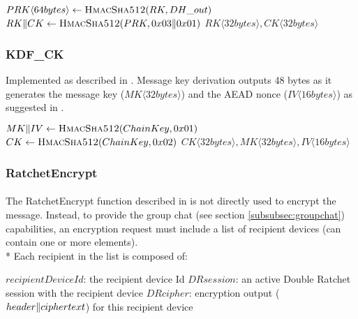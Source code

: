\documentclass[a4paper,11pt]{article}
\begin{document}
      \begin{algorithmic}
          \State $PRK\langle 64bytes\rangle  \gets \Call{HmacSha512}{RK, DH\_out}$
          \State $RK\Arrowvert CK \gets \Call{HmacSha512}{PRK, 0x03\Arrowvert 0x01}$
          \State \Return $RK\langle 32bytes\rangle , CK\langle 32bytes\rangle$
        \EndFunction
      \end{algorithmic}
    \subsubsection{KDF\_CK}
      \label{subsubsec:kdfck}
      Implemented as described in \cite[section 5.2]{doubleRatchet}. Message key derivation outputs 48 bytes as it generates the message key ($MK\langle 32bytes\rangle$) and the AEAD nonce ($IV\langle 16 bytes\rangle$) as suggested in \cite[section 3.1 - ENCRYPT]{doubleRatchet}.
      \begin{algorithmic}
          \State $MK\Arrowvert IV \gets \Call{HmacSha512}{ChainKey, 0x01}$
          \State $CK \gets \Call{HmacSha512}{ChainKey, 0x02}$
          \State \Return $CK\langle 32bytes\rangle ,MK\langle 32bytes\rangle ,IV\langle 16 bytes\rangle $
        \EndFunction
      \end{algorithmic}

    \subsubsection{RatchetEncrypt}
      \paragraph{}The RatchetEncrypt function described in \cite[section 3.4]{doubleRatchet} is not directly used to encrypt the message. Instead, to provide the group chat (see section \ref{subsubsec:groupchat}) capabilities, an encryption request must include a list of recipient devices (can contain one or more elements).\\*
      Each recipient in the list is composed of:
        \begin{algorithmic}
          \State $recipientDeviceId$: the recipient device Id
          \State $DRsession$: an active Double Ratchet session with the recipient device
          \State $DRcipher$: encryption output ($header\Arrowvert ciphertext$) for this recipient device
        \end{algorithmic}
\end{document}
